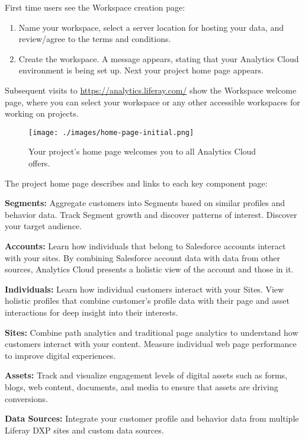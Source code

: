 First time users see the Workspace creation page:

\begin{enumerate}
\def\labelenumi{\arabic{enumi}.}
\item
  Name your workspace, select a server location for hosting your data,
  and review/agree to the terms and conditions.
\item
  Create the workspace. A message appears, stating that your Analytics
  Cloud environment is being set up. Next your project home page
  appears.
\end{enumerate}

Subsequent visits to \url{https://analytics.liferay.com/} show the
Workspace welcome page, where you can select your workspace or any other
accessible workspaces for working on projects.

\begin{figure}
\centering
\texttt{[image: ./images/home-page-initial.png]}
\caption{Your project's home page welcomes you to all Analytics Cloud
offers.}
\end{figure}

The project home page describes and links to each key component page:

\textbf{Segments:} Aggregate customers into Segments based on similar
profiles and behavior data. Track Segment growth and discover patterns
of interest. Discover your target audience.

\textbf{Accounts:} Learn how individuals that belong to Salesforce
accounts interact with your sites. By combining Salesforce account data
with data from other sources, Analytics Cloud presents a holistic view
of the account and those in it.

\textbf{Individuals:} Learn how individual customers interact with your
Sites. View holistic profiles that combine customer's profile data with
their page and asset interactions for deep insight into their interests.

\textbf{Sites:} Combine path analytics and traditional page analytics to
understand how customers interact with your content. Measure individual
web page performance to improve digital experiences.

\textbf{Assets:} Track and visualize engagement levels of digital assets
such as forms, blogs, web content, documents, and media to ensure that
assets are driving conversions.

\textbf{Data Sources:} Integrate your customer profile and behavior data
from multiple Liferay DXP sites and custom data sources.

